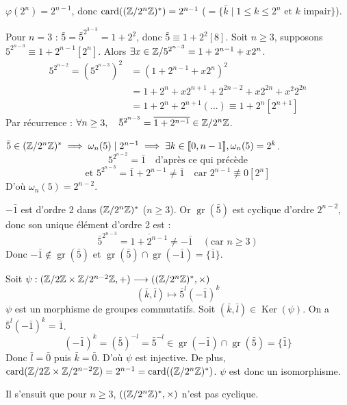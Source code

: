 \begin{solution}
$\varphi(2^n) = 2^{n-1}$, donc $\operatorname{card}((\mathbb Z/2^n\mathbb Z)^*) = 2^{n-1}$ ($=\{\bar{k} \mid 1 \leq k \leq 2^n \text{ et } k \text{ impair}\}$).

Pour $n=3$ : $\bar{5} = \bar{5}^{2^{3-3}} = 1+2^2$, donc $\bar{5} \equiv 1+2^2 [8]$.
Soit $n \geq 3$, supposons $5^{2^{n-3}} \equiv 1 + 2^{n-1} [2^n]$.
Alors $\exists x \in \mathbb Z / 5^{2^{n-3}} = 1 + 2^{n-1} + x 2^n$.
\begin{align*}
5^{2^{n-2}} = \left(5^{2^{n-3}}\right)^2 &= (1 + 2^{n-1} + x 2^n)^2 \\
&= 1 + 2^n + x 2^{n+1} + 2^{2n-2} + x 2^{2n} + x^2 2^{2n} \\
&= 1 + 2^n + 2^{n+1}(\dots) \equiv 1 + 2^n [2^{n+1}]
\end{align*}
Par récurrence : $\forall n \geq 3, \quad \bar{5}^{2^{n-3}} = \overline{1+2^{n-1}} \in \mathbb Z/2^n\mathbb Z$.

$\bar{5} \in (\mathbb Z/2^n\mathbb Z)^* \implies \omega_n(5) \mid 2^{n-1} \implies \exists k \in \llbracket 0, n-1 \rrbracket, \omega_n(5) = 2^k$.
\[ 5^{2^{n-2}} = \bar{1} \quad \text{d'après ce qui précède} \]
\[ \text{et } 5^{2^{n-3}} = \bar{1} + 2^{n-1} \neq \bar{1} \quad \text{car } 2^{n-1} \not\equiv 0 [2^n] \]
D'où $\boxed{\omega_n(5) = 2^{n-2}}$.

$-\bar{1}$ est d'ordre 2 dans $(\mathbb Z/2^n\mathbb Z)^*$ ($n \geq 3$).
Or $\operatorname{gr}(\bar{5})$ est cyclique d'ordre $2^{n-2}$, donc son unique élément d'ordre 2 est :
\[ \bar{5}^{2^{n-3}} = \overline{1+2^{n-1}} \neq -\bar{1} \quad (\text{car } n \geq 3) \]
Donc $-\bar{1} \notin \operatorname{gr}(\bar{5})$ et $\boxed{\operatorname{gr}(\bar{5}) \cap \operatorname{gr}(-\bar{1}) = \{\bar{1}\}}$.

Soit $\psi : (\mathbb Z/2\mathbb Z \times \mathbb Z/2^{n-2}\mathbb Z, +) \longrightarrow ((\mathbb Z/2^n\mathbb Z)^*, \times)$
\[ (\bar{k}, \bar{l}) \longmapsto \bar{5}^l (-\bar{1})^k \]
$\psi$ est un morphisme de groupes commutatifs.
Soit $(\bar{k}, \bar{l}) \in \operatorname{Ker}(\psi)$. On a $\bar{5}^l (-\bar{1})^k = \bar{1}$.
\[ (-\bar{1})^k = (\bar{5})^{-l} = \bar{5}^{-l} \in \operatorname{gr}(-\bar{1}) \cap \operatorname{gr}(\bar{5}) = \{\bar{1}\} \]
Donc $\bar{l} = \bar{0}$ puis $\bar{k} = \bar{0}$.
D'où $\psi$ est injective.
De plus, $\operatorname{card}(\mathbb Z/2\mathbb Z \times \mathbb Z/2^{n-2}\mathbb Z) = 2^{n-1} = \operatorname{card}((\mathbb Z/2^n\mathbb Z)^*)$.
$\psi$ est donc un isomorphisme.

Il s'ensuit que pour $n \geq 3$, $((\mathbb Z/2^n\mathbb Z)^*, \times)$ n'est pas cyclique.
\end{solution}

